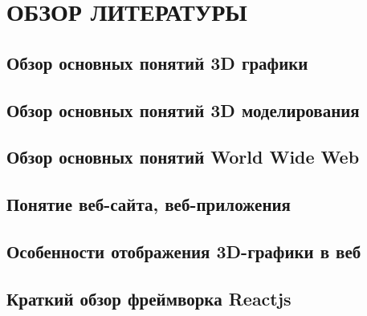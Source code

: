 \section{ОБЗОР ЛИТЕРАТУРЫ}
\label{sec:domain}

\subsection{Обзор основных понятий 3D графики}
\label{sub:domain:overview_3d}


\subsection{Обзор основных понятий 3D моделирования}
\label{sub:domain:overview_3d_modelling}


\subsection{Обзор основных понятий World Wide Web}
\label{sub:domain:overview_www}


\subsection{Понятие веб-сайта, веб-приложения}
\label{sub:domain:overview_website}


\subsection{Особенности отображения 3D-графики в веб}
\label{sub:domain:overview_3d_in_web}


\subsection{Краткий обзор фреймворка Reactjs}
\label{sub:domain:overview_spa_frameworks}

